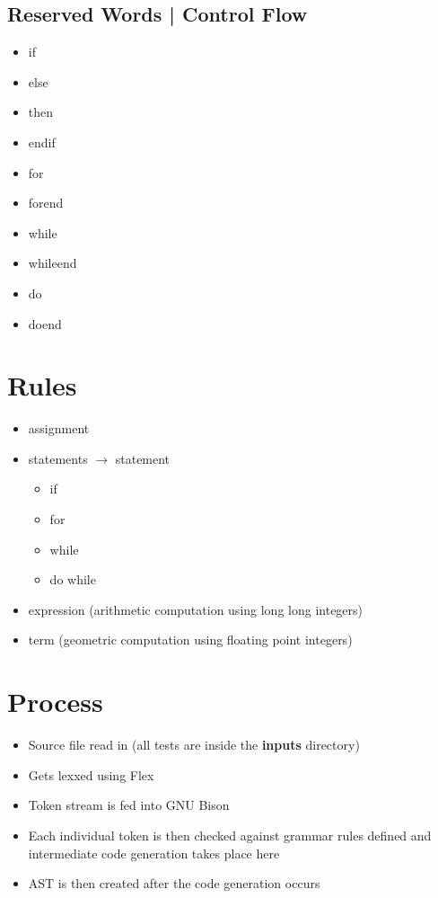 \documentclass{article}
\begin{document}
\subsection{Reserved Words | Control Flow}

\begin{itemize}
\item if
\item else
\item then
\item endif
\item for
\item forend
\item while
\item whileend
\item do
\item doend
\end{itemize}

\section{Rules}

\begin{itemize}
\item assignment
\item statements $\rightarrow$ statement
\begin{itemize}
\item if
\item for
\item while
\item do while
\end{itemize}
\item expression (arithmetic computation using long long integers)
\item term (geometric computation using floating point integers)
\end{itemize}


\newpage

\section{Process}

\begin{itemize}
\item Source file read in (all tests are inside the \textbf{inputs} directory)
\item Gets lexxed using Flex
\item Token stream is fed into GNU Bison
\item Each individual token is then checked against grammar rules defined and intermediate code generation takes place here
\item AST is then created after the code generation occurs
\end{itemize}
\end{document}
